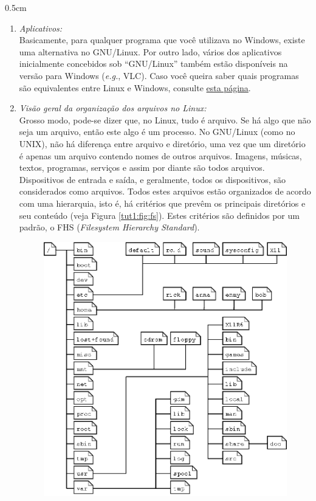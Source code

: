 \begin{refsection}
\begin {myindentpar}{0.5cm}
\begin{enumerate}[\itshape i.]
 \item \textit{Aplicativos:}\\
Basicamente, para qualquer programa que você utilizava no Windows, existe uma alternativa no GNU/Linux. Por outro lado, vários dos aplicativos inicialmente concebidos sob ``GNU/Linux'' também estão disponíveis na versão para Windows (\textit{e.g.}, VLC). Caso você queira saber quais programas são equivalentes entre Linux e Windows, consulte \href{http://wiki.linuxquestions.org/wiki/Linux_software_equivalent_to_Windows_software}{esta página}.
%
  \item \textit{Visão geral da organização dos arquivos no Linux:}\\
	Grosso modo, pode-se dizer que, no Linux, tudo é arquivo. Se há algo que não seja um arquivo, então este algo é um processo. No GNU/Linux (como no UNIX), não há diferença entre arquivo e diretório, uma vez que um diretório é apenas um arquivo contendo nomes de outros arquivos. Imagens, músicas, textos, programas, serviços e assim por diante são todos arquivos. Dispositivos de entrada e saída, e geralmente, todos os dispositivos, são considerados como arquivos. Todos estes arquivos estão organizados de acordo com uma hierarquia, isto é, há critérios que prevêm os principais diretórios e seu conteúdo (veja Figura \ref{tut1:fig:fs}). Estes critérios são definidos por um padrão, o FHS (\textit{Filesystem Hierarchy Standard}).\\
  \begin{figure}[H]
       \centering
      {\includegraphics[scale=1]{figures/tut1/fs_layout.eps}}

\end{figure}
\end{enumerate}
\end{myindentpar}
\end{refsection}

